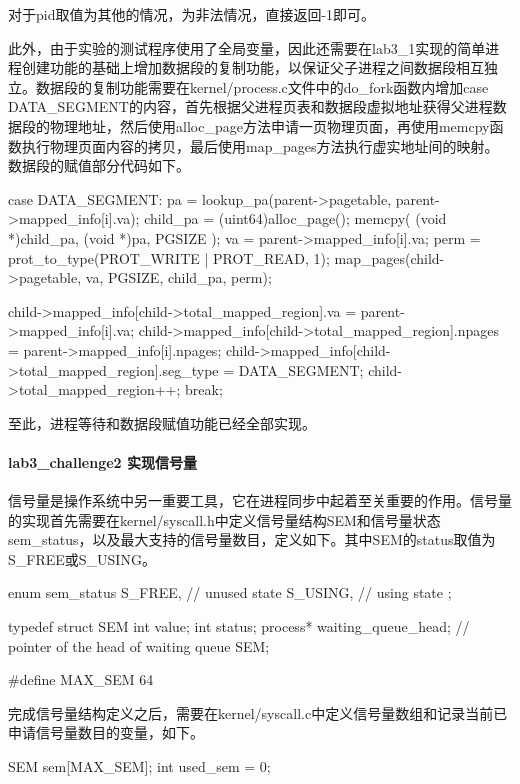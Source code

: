 对于pid取值为其他的情况，为非法情况，直接返回-1即可。

此外，由于实验的测试程序使用了全局变量，因此还需要在lab3_1实现的简单进程创建功能的基础上增加数据段的复制功能，以保证父子进程之间数据段相互独立。数据段的复制功能需要在kernel/process.c文件中的do_fork函数内增加case DATA_SEGMENT的内容，首先根据父进程页表和数据段虚拟地址获得父进程数据段的物理地址，然后使用alloc_page方法申请一页物理页面，再使用memcpy函数执行物理页面内容的拷贝，最后使用map_pages方法执行虚实地址间的映射。数据段的赋值部分代码如下。
\begin{cppcode}
    case DATA_SEGMENT:
        pa = lookup_pa(parent->pagetable, parent->mapped_info[i].va);
        child_pa = (uint64)alloc_page();
        memcpy( (void *)child_pa, (void *)pa, PGSIZE );
        va = parent->mapped_info[i].va;
        perm = prot_to_type(PROT_WRITE | PROT_READ, 1);
        map_pages(child->pagetable, va, PGSIZE, child_pa, perm);

        child->mapped_info[child->total_mapped_region].va = parent->mapped_info[i].va;
        child->mapped_info[child->total_mapped_region].npages =
                parent->mapped_info[i].npages;
        child->mapped_info[child->total_mapped_region].seg_type = DATA_SEGMENT;
        child->total_mapped_region++;
        break;
\end{cppcode}

至此，进程等待和数据段赋值功能已经全部实现。
\paragraph{lab3_challenge2 实现信号量} 
信号量是操作系统中另一重要工具，它在进程同步中起着至关重要的作用。信号量的实现首先需要在kernel/syscall.h中定义信号量结构SEM和信号量状态sem_status，以及最大支持的信号量数目，定义如下。其中SEM的status取值为S_FREE或S_USING。
\begin{cppcode}
enum sem_status {
    S_FREE,               // unused state
    S_USING,              // using state
};

typedef struct SEM {
    int value;
    int status;
    process* waiting_queue_head;    // pointer of the head of waiting queue
}SEM;

#define MAX_SEM 64
\end{cppcode}

完成信号量结构定义之后，需要在kernel/syscall.c中定义信号量数组和记录当前已申请信号量数目的变量，如下。
\begin{cppcode}
SEM sem[MAX_SEM];
int used_sem = 0;
\end{cppcode}

